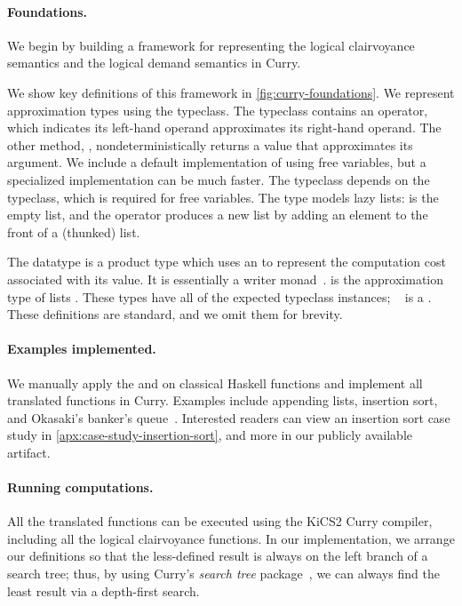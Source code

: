\paragraph{Foundations.}

We begin by building a framework for representing the logical clairvoyance
semantics and the logical demand semantics in Curry.

We show key definitions of this framework in \cref{fig:curry-foundations}.
We represent approximation types using the  typeclass. The typeclass
contains an \cdc{<~} operator, which indicates its left-hand operand
approximates its right-hand operand. The other method, ,
nondeterministically returns a value that approximates its argument. We include
a default implementation of  using free variables, but a specialized
implementation can be much faster. The  typeclass depends on the
 typeclass, which is required for free variables. The  type
models lazy lists:  is the empty list, and the \cdc{:~} operator
produces a new list by adding an element to the front of a (thunked) list.

The  datatype is a product type which uses an  to represent
the computation cost associated with its value. It is essentially a writer
monad~\cite{moggi-monad,wadler-monad}.  is the approximation type of
lists \cdc{[a]}. These types have all of the expected typeclass instances;
\eg~ is a . These definitions are standard, and we omit them
for brevity.

\paragraph{Examples implemented.}
We manually apply the \transCname{} and \transDname{} on classical Haskell
functions and implement all translated functions in Curry. Examples include appending lists, insertion sort, and Okasaki's banker's
queue~\cite{purely-functional}. Interested readers can view an insertion sort
case study in \cref{apx:case-study-insertion-sort}, and more in our publicly
available artifact.

\paragraph{Running computations.}
All the translated functions can be executed using the KiCS2 Curry compiler,
including all the logical clairvoyance functions. In our implementation, we
arrange our definitions so that the less-defined result is always on the left
branch of a search tree; thus, by using Curry's \emph{search tree}
package~\cite{DBLP:journals/jflp/BrasselHH04}, we can always find the least
result via a depth-first search.

